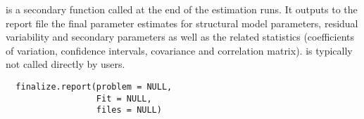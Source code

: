 %
\begin{Description}\relax
{} is a secondary function called at the end of the 
estimation runs. It outputs to the report file the final parameter estimates
for structural model parameters, residual variability and secondary parameters
as well as the related statistics (coefficients of variation, confidence
intervals, covariance and correlation matrix).  is 
typically not called directly by users.
\end{Description}
%
\begin{Usage}
\begin{verbatim}
  finalize.report(problem = NULL,
                  Fit = NULL,
                  files = NULL)
\end{verbatim}
\end{Usage}
%
